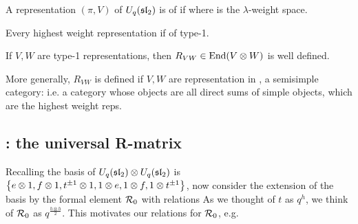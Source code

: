 \documentclass{article}
\begin{document}
\begin{definition}
A representation $(\pi,V)$ of $U_q(\mathfrak{sl}_2)$ is of  if 
where 
is the $\lambda$-weight space.
\end{definition}

\begin{lemma}
Every highest weight representation if of type-1. 
\end{lemma}

\begin{prop}
If $V,W$ are type-1 representations, then $R_{VW}\in \operatorname{End}(V \otimes W)$ is well defined.  
\end{prop}

\begin{remark}
More generally, $R_{VW}$ is defined if $V,W$ are representation in , a semisimple category: i.e. a category whose objects are all direct sums of simple objects, which are the highest weight reps. 
\end{remark}

\subsection{: the universal R-matrix}
Recalling the basis of $U_q(\mathfrak{sl}_2) \otimes U_q(\mathfrak{sl}_2)$ is $\left\{ e \otimes 1, f \otimes1, t^{\pm1}\otimes 1, 1\otimes e, 1\otimes f, 1 \otimes t^{\pm 1} \right\}$, now consider the extension of the basis by the formal element $\mathcal{R}_0$ with relations 
As we thought of $t$ as $q^h$, we think of $\mathcal{R}_0$ as $q^{\frac{h \otimes h}{2}}$. This motivates our relations for $\mathcal{R}_0$, e.g. 
\end{document}
